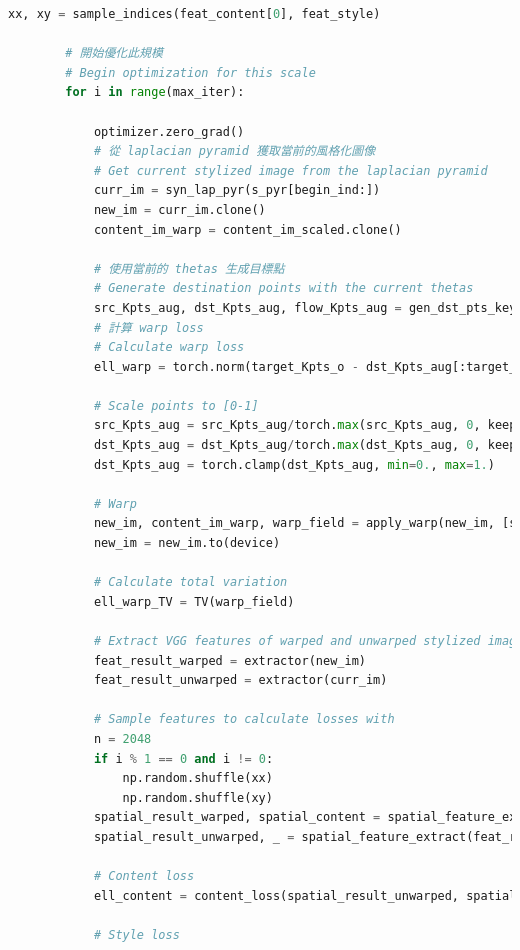 \documentclass[10pt,UTF8]{ctexart}
\begin{document}
\begin{lstlisting}[language={python}]
            xx, xy = sample_indices(feat_content[0], feat_style)

        # 開始優化此規模
        # Begin optimization for this scale
        for i in range(max_iter):

            optimizer.zero_grad()
            # 從 laplacian pyramid 獲取當前的風格化圖像
            # Get current stylized image from the laplacian pyramid
            curr_im = syn_lap_pyr(s_pyr[begin_ind:])
            new_im = curr_im.clone()
            content_im_warp = content_im_scaled.clone()
            
            # 使用當前的 thetas 生成目標點
            # Generate destination points with the current thetas
            src_Kpts_aug, dst_Kpts_aug, flow_Kpts_aug = gen_dst_pts_keypoints(src_Kpts, thetas_Kpts, no_flow_Kpts, border_Kpts)
            # 計算 warp loss
            # Calculate warp loss
            ell_warp = torch.norm(target_Kpts_o - dst_Kpts_aug[:target_Kpts.size(0)], dim=1).mean()

            # Scale points to [0-1]
            src_Kpts_aug = src_Kpts_aug/torch.max(src_Kpts_aug, 0, keepdim=True)[0]
            dst_Kpts_aug = dst_Kpts_aug/torch.max(dst_Kpts_aug, 0, keepdim=True)[0]
            dst_Kpts_aug = torch.clamp(dst_Kpts_aug, min=0., max=1.)

            # Warp
            new_im, content_im_warp, warp_field = apply_warp(new_im, [src_Kpts_aug], [dst_Kpts_aug], device, sharp=sharp_warp, im2=content_im_warp)
            new_im = new_im.to(device)

            # Calculate total variation
            ell_warp_TV = TV(warp_field)

            # Extract VGG features of warped and unwarped stylized images
            feat_result_warped = extractor(new_im)
            feat_result_unwarped = extractor(curr_im)

            # Sample features to calculate losses with
            n = 2048
            if i % 1 == 0 and i != 0:
                np.random.shuffle(xx)
                np.random.shuffle(xy)
            spatial_result_warped, spatial_content = spatial_feature_extract(feat_result_warped, feat_content, xx[:n], xy[:n])
            spatial_result_unwarped, _ = spatial_feature_extract(feat_result_unwarped, feat_content, xx[:n], xy[:n])

            # Content loss
            ell_content = content_loss(spatial_result_unwarped, spatial_content)

            # Style loss


\end{lstlisting}
\end{document}
